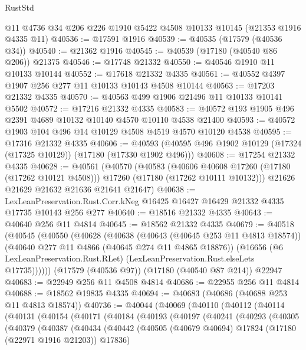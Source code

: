 \begin{lexlean}{RustStd}
\begin{coremodule}
    @11
    @4736
    @34
    @206
    @226
    @1910
    @5422
    @4508
    @10133
    @10145
    (@21353 @1916 @4335 @11)
@40536 := @17591 @1916
@40539 := @40535 (@17579 (@40536 @34))
@40540 := @21362 @1916
@40545 := @40539 (@17180 (@40540 @86 @206)) @21375
@40546 := @17748 @21332
@40550 := @40546 @1910 @11 @10133 @10144
@40552 := @17618 @21332 @4335
@40561 := @40552 @4397 @1907 @256 @277 @11 @10133 @10143 @4508 @10144
@40563 := @17203 @21332 @4335
@40570 := @40563 @499 @1906 @21496 @11 @10133 @10141 @5502
@40572 := @17216 @21332 @4335
@40583 := @40572 @193 @1905 @496 @2391 @4689 @10132 @10140 @4570 @10110 @4538 @21400
@40593 := @40572 @1903 @104 @496 @14 @10129 @4508 @4519 @4570 @10120 @4538
@40595 := @17316 @21332 @4335
@40606 := @40593 (@40595 @496 @1902 @10129 (@17324 (@17325 @10129)) (@17180 (@17330 @1902 @496)))
@40608 := @17254 @21332 @4335
@40628 := @40561
    (@40570
      (@40583
        (@40606 @40608 @17260 (@17180 (@17262 @10121 @4508)))
        @17260
        (@17180 (@17262 @10111 @10132)))
      @21626
      @21629
      @21632
      @21636
      @21641
      @21647)
@40638 := LexLeanPreservation.Rust.Corr.kNeg
    @16425
    @16427
    @16429
    @21332
    @4335
    @17735
    @10143
    @256
    @277
@40640 := @18516 @21332 @4335
@40643 := @40640 @256 @11 @4814
@40645 := @18562 @21332 @4335
@40679 := @40518
    (@40545
      (@40550
        (@40628
          (@40638
            (@40643 (@40645 @253 @11 @4813 @18574))
            (@40640 @277 @11 @4866 (@40645 @274 @11 @4865 @18876))
            (@16656
              (@6 LexLeanPreservation.Rust.RLet)
              (LexLeanPreservation.Rust.elseLets @17735))))))
    (@17579 (@40536 @97))
    (@17180 (@40540 @87 @214))
    @22947
@40683 := @22949 @256 @11 @4508 @4814
@40686 := @22955 @256 @11 @4814
@40688 := @18562 @19835 @4335
@40694 := @40683 (@40686 (@40688 @253 @11 @4813 @18574))
@40736 := @40044
    (@40069
      (@40110
        (@40112
          (@40114
            (@40131
              (@40154
                (@40171
                  (@40184
                    (@40193
                      (@40197
                        (@40241
                          (@40293
                            (@40305
                              (@40379
                                (@40387
                                  (@40434
                                    (@40442
                                      (@40505
                                        (@40679 @40694)
                                        @17824
                                        (@17180 (@22971 @1916 @21203))
                                        @17836)

\end{coremodule}
\end{lexlean}
